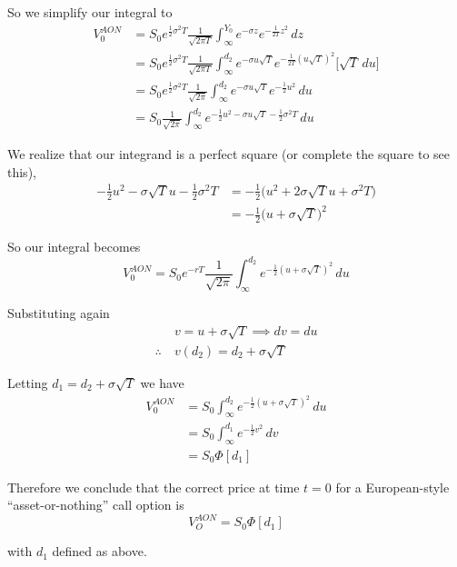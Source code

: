 \documentclass[12pt]{article}
\begin{document}
So we simplify our integral to
\begin{align*}
	V^{AON}_0 &= S_0e^{\frac{1}{2}\sigma^2T}\frac{1}{\sqrt{2\pi T}} \int^{Y_0}_{\infty} e^{-\sigma z} e^{-\frac{1}{2T}z^2}\,dz \\
	&= S_0e^{\frac{1}{2}\sigma^2T}\frac{1}{\sqrt{2\pi T}} \int^{d_2}_{\infty} e^{-\sigma u\sqrt{T}} e^{-\frac{1}{2T}(u\sqrt{T})^2}\big[\sqrt{T}\,du\big] \\
	&= S_0e^{\frac{1}{2}\sigma^2T}\frac{1}{\sqrt{2\pi}} \int^{d_2}_{\infty} e^{-\sigma u\sqrt{T}} e^{-\frac{1}{2}u^2}\,du \\
	&= S_0\frac{1}{\sqrt{2\pi}} \int^{d_2}_{\infty} e^{-\frac{1}{2}u^2 - \sigma u \sqrt{T} - \frac{1}{2}\sigma^2T}\,du
\end{align*}

We realize that our integrand is a perfect square (or complete the square to see this),
\begin{align*}
	-\frac{1}{2}u^2 - \sigma\sqrt{T}u  - \frac{1}{2}\sigma^2T &= -\frac{1}{2}\big(u^2 + 2\sigma\sqrt{T}u + \sigma^2T \big) \\
	&= -\frac{1}{2}\big(u + \sigma\sqrt{T})^2
\end{align*}

So our integral becomes
\begin{equation*}
	V^{AON}_0 = S_0 e^{-rT}\frac{1}{\sqrt{2\pi}}\int^{d_2}_{\infty} e^{-\frac{1}{2}(u + \sigma\sqrt{T})^2}\,du
\end{equation*}

Substituting again
\begin{align*}
	&v = u + \sigma\sqrt{T} \implies dv = du \\
	\therefore~&v(d_2) = d_2 + \sigma\sqrt{T} 
\end{align*}

Letting $d_1 = d_2 + \sigma\sqrt{T}$ we have
\begin{align*}
	V^{AON}_0 &= S_0\int^{d_2}_{\infty} e^{-\frac{1}{2}(u + \sigma\sqrt{T})^2}\,du \\
	&= S_0\int^{d_1}_{\infty} e^{-\frac{1}{2}v^2}\,dv \\
	&= S_0\Phi[d_1]
\end{align*}

Therefore we conclude that the correct price at time $t = 0$ for a European-style ``asset-or-nothing'' call option is
\begin{equation*}
	V^{AON}_O = S_0\Phi[d_1]
\end{equation*}

with $d_1$ defined as above.
\end{document}
